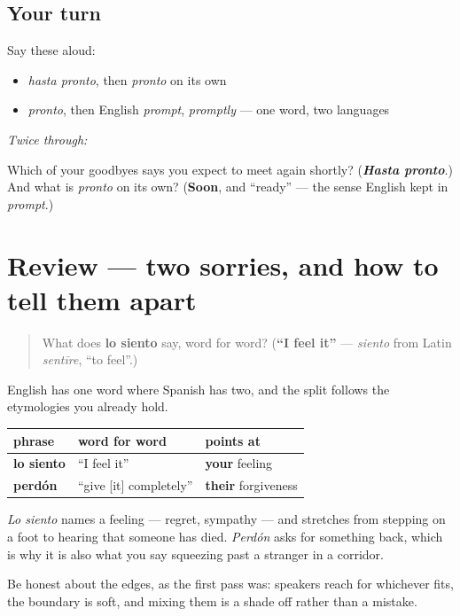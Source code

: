 \subsection*{Your turn}
Say these aloud:

\begin{itemize}
\raggedright
  \item \emph{hasta pronto}, then \emph{pronto} on its own
  \item \emph{pronto}, then English \emph{prompt}, \emph{promptly} — one word, two languages
\end{itemize}

\emph{Twice through:}

\begin{tcolorbox}[breakable,colback=teal!4,colframe=teal!35!black,title={Before you move on}]
Which of your goodbyes says you expect to meet again shortly? (\emph{\textbf{Hasta pronto}}.) And what is \emph{pronto} on its own? (\textbf{Soon}, and \textquotedblleft{}ready\textquotedblright{} — the sense English kept in \emph{prompt}.)
\end{tcolorbox}
\section[(review)]{Review — two sorries, and how to tell them apart}

\label{lesson:ES-C318-repaso-disculparse}



\begin{quote}
What does \textbf{lo siento} say, word for word? (\textbf{\textquotedblleft{}I feel it\textquotedblright{}} — \emph{siento} from Latin \emph{sentīre}, \textquotedblleft{}to feel\textquotedblright{}.)
\end{quote}

\begin{grammarlens}[title={What you've built}]
English has one word where Spanish has two, and the split follows the etymologies you already hold.

\noindent
\begin{tabularx}{\linewidth}{@{}>{\raggedright\arraybackslash}X>{\raggedright\arraybackslash}X>{\raggedright\arraybackslash}X@{}}
\toprule
\textbf{phrase} & \textbf{word for word} & \textbf{points at} \\
\midrule
\textbf{lo siento} & \textquotedblleft{}I feel it\textquotedblright{} & \textbf{your} feeling \\
\textbf{perdón} & \textquotedblleft{}give {[}it{]} completely\textquotedblright{} & \textbf{their} forgiveness \\
\bottomrule
\end{tabularx}

\emph{Lo siento} names a feeling — regret, sympathy — and stretches from stepping on a foot to hearing that someone has died. \emph{Perdón} asks for something back, which is why it is also what you say squeezing past a stranger in a corridor.

Be honest about the edges, as the first pass was: speakers reach for whichever fits, the boundary is soft, and mixing them is a shade off rather than a mistake.
\end{grammarlens}

